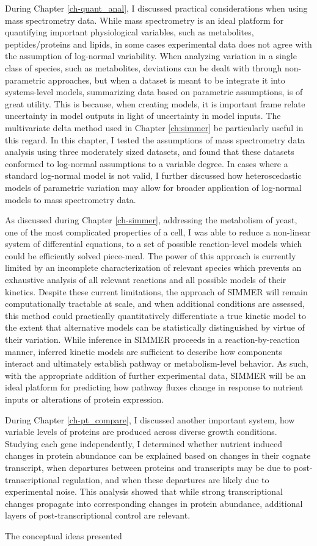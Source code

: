 During Chapter \ref{ch-quant_anal}, I discussed practical considerations when using mass spectrometry data.  While mass spectrometry is an ideal platform for quantifying important physiological variables, such as metabolites, peptides/proteins and lipids, in some cases experimental data does not agree with the assumption of log-normal variability. When analyzing variation in a single class of species, such as metabolites, deviations can be dealt with through non-parametric approaches, but when a dataset is meant to be integrate it into systems-level models, summarizing data based on parametric assumptions, is of great utility.  This is because, when creating models, it is important frame relate uncertainty in model outputs in light of uncertainty in model inputs. The multivariate delta method used in Chapter \ref{ch:simmer} be particularly useful in this regard. In this chapter, I tested the assumptions of mass spectrometry data analysis using three moderately sized datasets, and found that these datasets conformed to log-normal assumptions to a variable degree. In cases where a standard log-normal model is not valid, I further discussed how heteroscedastic models of parametric variation may allow for broader application of log-normal models to mass spectrometry data.

As discussed during Chapter \ref{ch-simmer}, addressing the metabolism of yeast, one of the most complicated properties of a cell, I was able to reduce a non-linear system of differential equations, to a set of possible reaction-level models which could be efficiently solved piece-meal. The power of this approach is currently limited by an incomplete characterization of relevant species which prevents an exhaustive analysis of all relevant reactions and all possible models of their kinetics. Despite these current limitations, the approach of SIMMER will remain computationally tractable at scale, and when additional conditions are assessed, this method could practically quantitatively differentiate a true kinetic model to the extent that alternative models can be statistically distinguished by virtue of their variation. While inference in SIMMER proceeds in a reaction-by-reaction manner, inferred kinetic models are sufficient to describe how components interact and ultimately establish pathway or metabolism-level behavior. As such, with the appropriate addition of further experimental data, SIMMER will be an ideal platform for predicting how pathway fluxes change in response to nutrient inputs or alterations of protein expression.

During Chapter \ref{ch-pt_compare}, I discussed another important system, how variable levels of proteins are produced across diverse growth conditions. Studying each gene independently, I determined whether nutrient induced changes in protein abundance can be explained based on changes in their cognate transcript, when departures between proteins and transcripts may be due to post-transcriptional regulation, and when these departures are likely due to experimental noise. This analysis showed that while strong transcriptional changes propagate into corresponding changes in protein abundance, additional layers of post-transcriptional control are relevant.

The conceptual ideas presented 